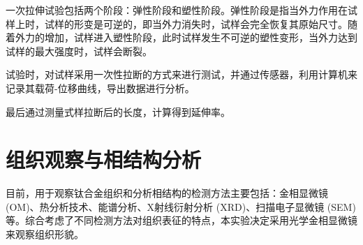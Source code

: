 一次拉伸试验包括两个阶段：弹性阶段和塑性阶段。弹性阶段是指当外力作用在试样上时，试样的形变是可逆的，即当外力消失时，试样会完全恢复其原始尺寸。随着外力的增加，试样进入塑性阶段，此时试样发生不可逆的塑性变形，当外力达到试样的最大强度时，试样会断裂。

试验时，对试样采用一次性拉断的方式来进行测试，并通过传感器，利用计算机来记录其载荷-位移曲线，导出数据进行分析。

最后通过测量式样拉断后的长度，计算得到延伸率。

\section{组织观察与相结构分析}
目前，用于观察钛合金组织和分析相结构的检测方法主要包括：金相显微镜 (OM)、热分析技术、能谱分析、X射线衍射分析 (XRD)、扫描电子显微镜 (SEM)等。综合考虑了不同检测方法对组织表征的特点，本实验决定采用光学金相显微镜 来观察组织形貌。

